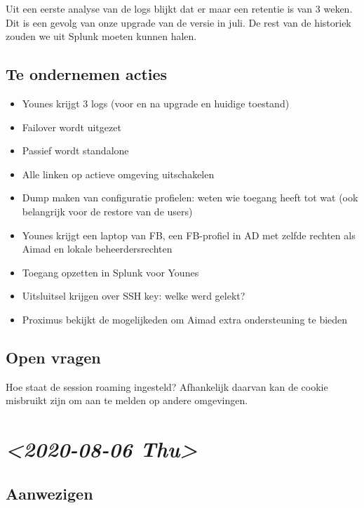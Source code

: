 \documentclass[11pt]{article}
\begin{document}
Uit een eerste analyse van de logs blijkt dat er maar een retentie is van 3 weken. Dit is een gevolg van onze upgrade van de versie in juli. De rest van de historiek zouden we uit Splunk moeten kunnen halen.

\subsection{Te ondernemen acties}
\label{sec:org5dfe59f}
\begin{itemize}
\item Younes krijgt 3 logs (voor en na upgrade en huidige toestand)
\item Failover wordt uitgezet
\item Passief wordt standalone
\item Alle linken op actieve omgeving uitschakelen
\item Dump maken van configuratie profielen: weten wie toegang heeft tot wat (ook belangrijk voor de restore van de users)
\item Younes krijgt een laptop van FB, een FB-profiel in AD met zelfde rechten als Aimad en lokale beheerdersrechten
\item Toegang opzetten in Splunk voor Younes
\item Uitsluitsel krijgen over SSH key: welke werd gelekt?
\item Proximus bekijkt de mogelijkeden om Aimad extra ondersteuning te bieden
\end{itemize}

\subsection{Open vragen}
\label{sec:orgd6dc591}
Hoe staat de session roaming ingesteld? Afhankelijk daarvan kan de cookie misbruikt zijn om aan te melden op andere omgevingen.


\section{\textit{<2020-08-06 Thu>}}
\label{sec:org7defad7}
\subsection{Aanwezigen}
\label{sec:orgd98ae69}
\end{document}

